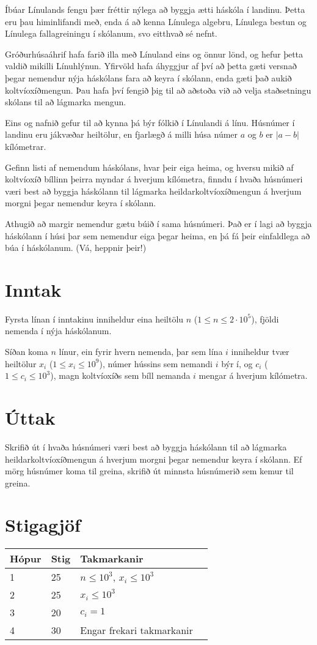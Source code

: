 
Íbúar Línulands fengu þær fréttir nýlega að byggja ætti háskóla í landinu.
Þetta eru þau himinlifandi með, enda á að kenna Línulega algebru, Línulega
bestun og Línulega fallagreiningu í skólanum, svo eitthvað sé nefnt.

Gróðurhúsaáhrif hafa farið illa með Línuland eins og önnur lönd, og hefur þetta
valdið mikilli Línuhlýnun. Yfirvöld hafa áhyggjur af því að þetta gæti versnað
þegar nemendur nýja háskólans fara að keyra í skólann, enda gæti það aukið
koltvíoxíðmengun. Þau hafa því fengið þig til að aðstoða við að velja
staðsetningu skólans til að lágmarka mengun.

Eins og nafnið gefur til að kynna þá býr fólkið í Línulandi á línu. Húsnúmer í
landinu eru jákvæðar heiltölur, en fjarlægð á milli húsa númer $a$ og $b$ er
$|a-b|$ kílómetrar.

Gefinn listi af nemendum háskólans, hvar þeir eiga heima, og hversu mikið af
koltvíoxíð bíllinn þeirra myndar á hverjum kílómetra, finndu í hvaða húsnúmeri
væri best að byggja háskólann til lágmarka heildarkoltvíoxíðmengun á hverjum
morgni þegar nemendur keyra í skólann.

Athugið að margir nemendur gætu búið í sama húsnúmeri. Það er í lagi að byggja
háskólann í húsi þar sem nemendur eiga þegar heima, en þá fá þeir einfaldlega
að búa í háskólanum. (Vá, heppnir þeir!)

\section*{Inntak}
Fyrsta línan í inntakinu inniheldur eina heiltölu $n$ ($1 \leq n \leq
2\cdot10^5$), fjöldi nemenda í nýja háskólanum.

Síðan koma $n$ línur, ein fyrir hvern nemenda, þar sem lína $i$ inniheldur tvær
heiltölur $x_i$ ($1 \leq x_i \leq 10^9$), númer hússins sem nemandi $i$ býr í,
og $c_i$ ($1 \leq c_i \leq 10^3$), magn koltvíoxíðs sem bíll nemanda $i$ mengar
á hverjum kílómetra.

\section*{Úttak}
Skrifið út í hvaða húsnúmeri væri best að byggja háskólann til að lágmarka
heildarkoltvíoxíðmengun á hverjum morgni þegar nemendur keyra í skólann. Ef mörg
húsnúmer koma til greina, skrifið út minnsta húsnúmerið sem kemur til greina.

\section*{Stigagjöf}
\begin{tabular}{|l|l|l|l|}
\hline
Hópur & Stig & Takmarkanir \\ \hline
1     & 25   & $n \leq 10^3$, $x_i \leq 10^3$ \\ \hline
2     & 25   & $x_i \leq 10^3$ \\ \hline
3     & 20   & $c_i = 1$ \\ \hline
4     & 30   & Engar frekari takmarkanir\\ \hline
\end{tabular}

